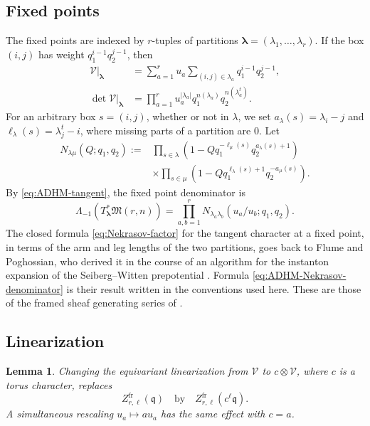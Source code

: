 \documentclass{amsart}
\newtheorem{lemma}{Lemma}
\theoremstyle{definition}
\numberwithin{equation}{section}
\newcommand{\cV}{\mathcal V}
\newcommand{\M}{\mathfrak M}
\begin{document}
\subsection{Fixed points}
The fixed points are indexed by \(r\)-tuples of partitions \(\boldsymbol\lambda=(\lambda_1,\ldots,\lambda_r)\).  If the box \((i,j)\) has weight \(q_1^{i-1}q_2^{j-1}\), then
\begin{align}
 \cV|_{\boldsymbol\lambda}
 &=\sum_{a=1}^r u_a
   \sum_{(i,j)\in\lambda_a}q_1^{i-1}q_2^{j-1},
\label{eq:V-fixed-weight}\\
 \det\cV|_{\boldsymbol\lambda}
 &=\prod_{a=1}^r u_a^{|\lambda_a|}
   q_1^{n(\lambda_a)}q_2^{n(\lambda_a^t)}.
\label{eq:det-fixed-weight}
\end{align}
For an arbitrary box \(s=(i,j)\), whether or not in \(\lambda\), we set \(a_\lambda(s)=\lambda_i-j\) and \(\ell_\lambda(s)=\lambda_j^t-i\), where missing parts of a partition are \(0\).  Let
\begin{equation}
\begin{aligned}
 N_{\lambda\mu}(Q;q_1,q_2)
 :={}&\prod_{s\in\lambda}
 \left(1-Qq_1^{-\ell_\mu(s)}q_2^{a_\lambda(s)+1}\right)\\
 &\times\prod_{s\in\mu}
 \left(1-Qq_1^{\ell_\lambda(s)+1}q_2^{-a_\mu(s)}\right).
\end{aligned}
\label{eq:Nekrasov-factor}
\end{equation}
By \eqref{eq:ADHM-tangent}, the fixed point denominator is
\begin{equation}
 \Lambda_{-1}\!\left(T^*_{\boldsymbol\lambda}\M(r,n)\right)
 =\prod_{a,b=1}^r
 N_{\lambda_a\lambda_b}(u_a/u_b;q_1,q_2).
\label{eq:ADHM-Nekrasov-denominator}
\end{equation}
The closed formula \eqref{eq:Nekrasov-factor} for the tangent character at a fixed point, in terms of the arm and leg lengths of the two partitions, goes back to Flume and Poghossian, who derived it in the course of an algorithm for the instanton expansion of the Seiberg--Witten prepotential \cite[equations~(4.45)--(4.46)]{FlumePoghossian}.  Formula \eqref{eq:ADHM-Nekrasov-denominator} is their result written in the conventions used here.  These are those of the framed sheaf generating series of \cite{NakajimaYoshiokaII}.

\subsection{Linearization}
\begin{lemma}
\label{lem:linearization}
Changing the equivariant linearization from \(\cV\) to \(c\otimes\cV\), where \(c\) is a torus character, replaces
\[
 Z_{r,\ell}^{\mathrm{fr}}(\mathfrak q)
 \quad\text{by}\quad
 Z_{r,\ell}^{\mathrm{fr}}(c^\ell\mathfrak q).
\]
A simultaneous rescaling \(u_a\mapsto au_a\) has the same effect with \(c=a\).
\end{lemma}
\end{document}
